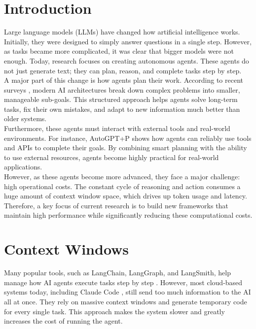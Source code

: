 \section{Introduction}
Large language models (LLMs) have changed how artificial intelligence works. Initially, they were designed to simply answer questions in a single step. However, as tasks became more complicated, it was clear that bigger models were not enough. Today, research focuses on creating autonomous agents. These agents do not just generate text; they can plan, reason, and complete tasks step by step.\\

A major part of this change is how agents plan their work. According to recent surveys \cite{agent_survey}, modern AI architectures break down complex problems into smaller, manageable sub-goals. This structured approach helps agents solve long-term tasks, fix their own mistakes, and adapt to new information much better than older systems.\\

Furthermore, these agents must interact with external tools and real-world environments. For instance, AutoGPT+P \cite{autogpt_p} shows how agents can reliably use tools and APIs to complete their goals. By combining smart planning with the ability to use external resources, agents become highly practical for real-world applications.\\

However, as these agents become more advanced, they face a major challenge: high operational costs. The constant cycle of reasoning and action consumes a huge amount of context window space, which drives up token usage and latency. Therefore, a key focus of current research is to build new frameworks that maintain high performance while significantly reducing these computational costs.\\

\section{Context Windows}
Many popular tools, such as LangChain, LangGraph, and LangSmith, help manage how AI agents execute tasks step by step \cite{langchain_langgraph}. However, most cloud-based systems today, including Claude Code \cite{claude_code_dive}, still send too much information to the AI all at once. They rely on massive context windows and generate temporary code for every single task. This approach makes the system slower and greatly increases the cost of running the agent.\\

